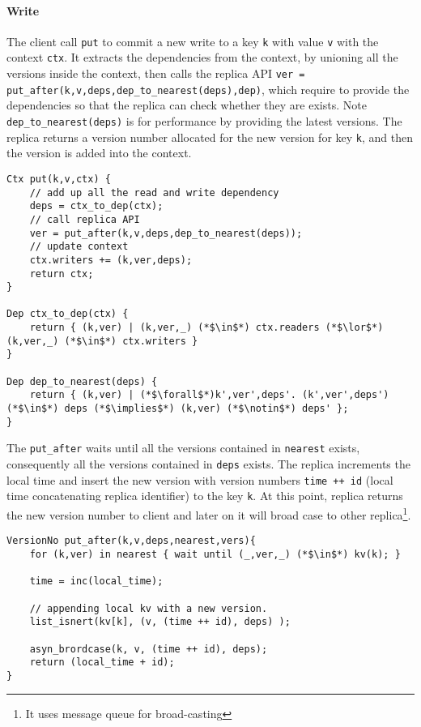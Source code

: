 \paragraph{\bf Write}
The client call \verb|put| to commit a new write to a key \verb|k| with value \verb|v| with the context \verb|ctx|.
It extracts the dependencies from the context, by unioning all the versions inside the context,
then calls the replica API \verb|ver = put_after(k,v,deps,dep_to_nearest(deps),dep)|,
which require to provide the dependencies so that the replica can check whether they are exists.
Note \verb|dep_to_nearest(deps)| is for performance by providing the latest versions.
The replica returns a version number allocated for the new version for key \verb|k|,
and then the version is added into the context.

\begin{lstlisting}[caption={Client API for write},label={lst:cops-client-api-write}]
Ctx put(k,v,ctx) {
    // add up all the read and write dependency
    deps = ctx_to_dep(ctx);
    // call replica API
    ver = put_after(k,v,deps,dep_to_nearest(deps));
    // update context
    ctx.writers += (k,ver,deps);
    return ctx;
}

Dep ctx_to_dep(ctx) { 
    return { (k,ver) | (k,ver,_) (*$\in$*) ctx.readers (*$\lor$*) (k,ver,_) (*$\in$*) ctx.writers } 
}

Dep dep_to_nearest(deps) {
    return { (k,ver) | (*$\forall$*)k',ver',deps'. (k',ver',deps') (*$\in$*) deps (*$\implies$*) (k,ver) (*$\notin$*) deps' };
}
\end{lstlisting}

The \verb|put_after| waits until all the versions contained in \verb|nearest| exists,
consequently all the versions contained in \verb|deps| exists.
The replica increments the local time and insert the new version with version numbers \verb|time ++ id| (local time concatenating replica identifier) to the key \verb|k|.
At this point, replica returns the new version number to client and 
later on it will broad case to other replica\footnote{It uses message queue for broad-casting}.

\begin{lstlisting}[caption={Replica API for write},label={lst:cops-replica-api-write}]
VersionNo put_after(k,v,deps,nearest,vers){
    for (k,ver) in nearest { wait until (_,ver,_) (*$\in$*) kv(k); }

    time = inc(local_time);

    // appending local kv with a new version.
    list_isnert(kv[k], (v, (time ++ id), deps) );

    asyn_brordcase(k, v, (time ++ id), deps);
    return (local_time + id);
}
\end{lstlisting}

